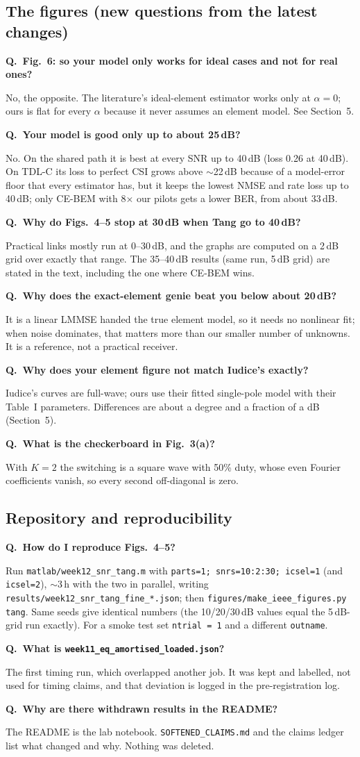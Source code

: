\documentclass[11pt,a4paper]{article}
\newcounter{qn}
\newcommand{\Q}[1]{\stepcounter{qn}\par\medskip\noindent\textbf{Q\theqn.\ #1}\par\nopagebreak\noindent}
\begin{document}
\subsection{The figures (new questions from the latest changes)}
\Q{Fig.~6: so your model only works for ideal cases and not for real ones?}
No, the opposite. The literature's ideal-element estimator works only at $\alpha=0$; ours is flat for every $\alpha$
because it never assumes an element model. See Section~5.
\Q{Your model is good only up to about 25\,dB?}
No. On the shared path it is best at every SNR up to 40\,dB (loss 0.26 at 40\,dB). On TDL-C its loss to perfect CSI grows
above $\sim$22\,dB because of a model-error floor that every estimator has, but it keeps the lowest NMSE and rate loss up to
40\,dB; only CE-BEM with 8$\times$ our pilots gets a lower BER, from about 33\,dB.
\Q{Why do Figs.~4--5 stop at 30\,dB when Tang go to 40\,dB?}
Practical links mostly run at 0--30\,dB, and the graphs are computed on a 2\,dB grid over exactly that range. The 35--40\,dB
results (same run, 5\,dB grid) are stated in the text, including the one where CE-BEM wins.
\Q{Why does the exact-element genie beat you below about 20\,dB?}
It is a linear LMMSE handed the true element model, so it needs no nonlinear fit; when noise dominates, that matters more
than our smaller number of unknowns. It is a reference, not a practical receiver.
\Q{Why does your element figure not match Iudice's exactly?}
Iudice's curves are full-wave; ours use their fitted single-pole model with their Table~I parameters. Differences are about
a degree and a fraction of a dB (Section~5).
\Q{What is the checkerboard in Fig.~3(a)?}
With $K=2$ the switching is a square wave with 50\% duty, whose even Fourier coefficients vanish, so every second
off-diagonal is zero.

\subsection{Repository and reproducibility}
\Q{How do I reproduce Figs.~4--5?}
Run \texttt{matlab/week12\_snr\_tang.m} with \texttt{parts=1; snrs=10:2:30; icsel=1} (and \texttt{icsel=2}),
$\sim$3\,h with the two in parallel, writing \texttt{results/week12\_snr\_tang\_fine\_*.json}; then
\texttt{figures/make\_ieee\_figures.py tang}. Same seeds give identical numbers (the 10/20/30\,dB values equal the 5\,dB-grid
run exactly). For a smoke test set \texttt{ntrial = 1} and a different \texttt{outname}.
\Q{What is \texttt{week11\_eq\_amortised\_loaded.json}?}
The first timing run, which overlapped another job. It was kept and labelled, not used for timing claims, and that deviation
is logged in the pre-registration log.
\Q{Why are there withdrawn results in the README?}
The README is the lab notebook. \texttt{SOFTENED\_CLAIMS.md} and the claims ledger list what changed and why. Nothing was
deleted.
\end{document}

